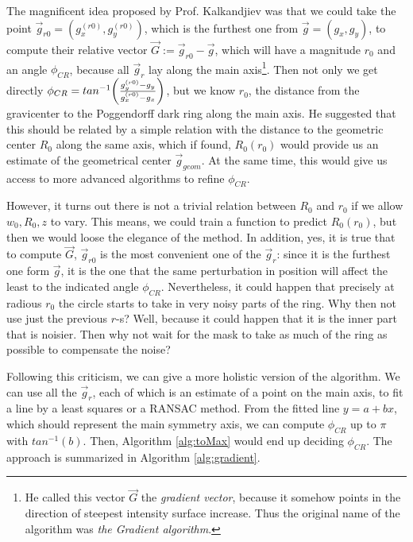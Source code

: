 \documentclass[11pt, a4paper, twoside]{article} %
\begin{document}
The magnificent idea proposed by Prof. Kalkandjiev was that we could take the point $\vec{g}_{r0}=(g_x^{(r0)}, g_y^{(r0)})$, which is the furthest one from $\vec{g}=(g_x,g_y)$, to compute their relative vector $\vec{G}:=\vec{g}_{r0}-\vec{g}$, which will have a magnitude $r_0$ and an angle $\phi_{CR}$, because all $\vec{g}_r$ lay along the main axis\footnote{He called this vector $\vec{G}$ the {\em gradient vector}, because it somehow points in the direction of steepest intensity surface increase. Thus the original name of the algorithm was {\em the Gradient algorithm}.}. Then not only we get directly $\phi_{CR}=tan^{-1}\qty(\frac{g_y^{(r0)}-g_y}{g_x^{(r0)}-g_x})$, but we know $r_0$, the distance from the gravicenter to the Poggendorff dark ring along the main axis. He suggested that this should be related by a simple relation with the distance to the geometric center $R_0$ along the same axis, which if found, $R_0(r_0)$ would provide us an estimate of the geometrical center $\vec{g}_{geom}$. At the same time, this would give us access to more advanced algorithms to refine $\phi_{CR}$.

However, it turns out there is not a trivial relation between $R_0$ and $r_0$ if we allow $w_0,R_0,z$ to vary. This means, we could train a function to predict $R_0(r_0)$, but then we would loose the elegance of the method. In addition, yes, it is true that to compute $\vec{G}$, $\vec{g}_{r0}$ is the most convenient one of the $\vec{g}_r$: since it is the furthest one form $\vec{g}$, it is the one that the same perturbation in position will affect the least to the indicated angle $\phi_{CR}$. Nevertheless, it could happen that precisely at radious $r_0$ the circle starts to take in very noisy parts of the ring. Why then not use just the previous $r$-s? Well, because it could happen that it is the inner part that is noisier. Then why not wait for the mask to take as much of the ring as possible to compensate the noise?

Following this criticism, we can give a more holistic version of the algorithm. We can use all the $\vec{g}_r$, each of which is an estimate of a point on the main axis, to fit a line by a least squares or a RANSAC \cite{RANSAC} method. From the fitted line $y=a+bx$, which should represent the main symmetry axis, we can compute $\phi_{CR}$ up to $\pi$ with $tan^{-1}(b)$. Then, Algorithm \ref{alg:toMax} would end up deciding $\phi_{CR}$. The approach is summarized in Algorithm \ref{alg:gradient}.
\end{document}
